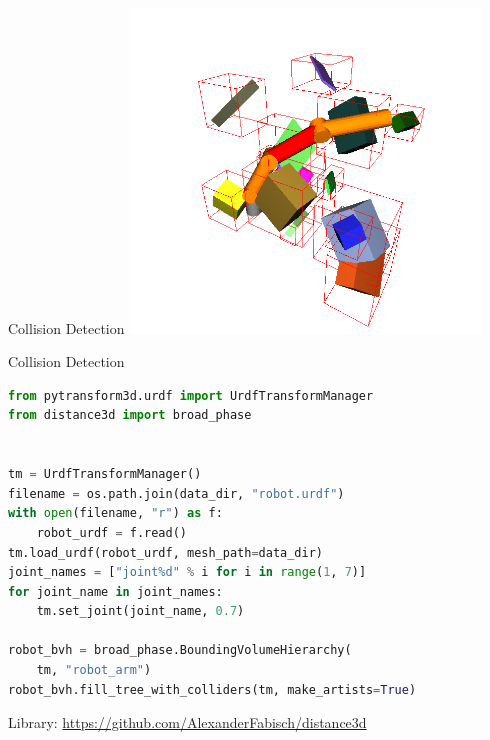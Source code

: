 \documentclass[14pt]{beamer}
\begin{document}
\begin{frame}{Collision Detection}
\includegraphics[width=0.7\textwidth]{images/collision_detection}
\end{frame}

\begin{frame}[fragile]{Collision Detection}
\begin{lstlisting}[language=Python]
from pytransform3d.urdf import UrdfTransformManager
from distance3d import broad_phase


tm = UrdfTransformManager()
filename = os.path.join(data_dir, "robot.urdf")
with open(filename, "r") as f:
    robot_urdf = f.read()
tm.load_urdf(robot_urdf, mesh_path=data_dir)
joint_names = ["joint%d" % i for i in range(1, 7)]
for joint_name in joint_names:
    tm.set_joint(joint_name, 0.7)

robot_bvh = broad_phase.BoundingVolumeHierarchy(
    tm, "robot_arm")
robot_bvh.fill_tree_with_colliders(tm, make_artists=True)
\end{lstlisting}
{\scriptsize Library: \url{https://github.com/AlexanderFabisch/distance3d}}
\end{frame}
\end{document}

